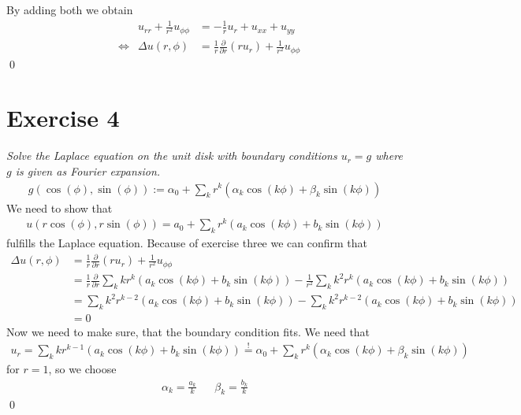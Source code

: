 \documentclass[11pt, a4paper, german]{article}
\begin{document}
	By adding both we obtain\begin{align*}
		&&u_{rr}+\frac{1}{r^2}u_{\phi\phi}&=-\frac{1}{r}u_r+u_{xx}+u_{yy}\\
		&\Leftrightarrow & \Delta u(r,\phi )&=\frac{1}{r}\frac{\partial}{\partial r}\left(r u_r \right)+\frac{1}{r^2}u_{\phi\phi}
	\end{align*}
	\qed
	\section*{Exercise 4}
	\textit{Solve the Laplace equation on the unit disk with boundary conditions $u_r=g$ where $g$ is given as Fourier expansion.	\begin{align*}
		g(\cos(\phi),\sin(\phi)):=\alpha_0+\sum_k r^k(\alpha_k\cos(k\phi)+\beta_k\sin(k\phi))
	\end{align*}
	}
	We need to show that\begin{align*}
		u(r\cos(\phi),r\sin(\phi))=a_0+\sum_k r^k(a_k\cos(k\phi)+b_k\sin(k\phi))
	\end{align*}
	fulfills the Laplace equation. Because of exercise three we can confirm that\begin{align*}
	 \Delta u(r,\phi )&=\frac{1}{r}\frac{\partial}{\partial r}\left(r u_r \right)+\frac{1}{r^2}u_{\phi\phi}\\
	&= \frac{1}{r}\frac{\partial}{\partial r}\sum_k kr^k(a_k\cos(k\phi)+b_k\sin(k\phi))-\frac{1}{r^2}\sum_k k^2r^k(a_k\cos(k\phi)+b_k\sin(k\phi))\\
	&=\sum_k k^2 r^{k-2}(a_k\cos(k\phi)+b_k\sin(k\phi))-\sum_k k^2r^{k-2}(a_k\cos(k\phi)+b_k\sin(k\phi))\\
	&= 0
	\end{align*}
	Now we need to make sure, that the boundary condition fits. We need that\begin{align*}
		u_r=\sum_k kr^{k-1}(a_k\cos(k\phi)+b_k\sin(k\phi))\overset{!}{=}\alpha_0+\sum_k r^k(\alpha_k\cos(k\phi)+\beta_k\sin(k\phi))
	\end{align*}
	for $r=1$, so we choose\begin{align*}
		\alpha_k=\frac{a_k}{k}&& \beta_k=\frac{b_k}{k}
	\end{align*}
	\qed
\end{document}

